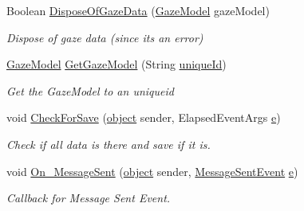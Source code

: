 \begin{DoxyCompactItemize}
Boolean \hyperlink{class_web_analyzer_1_1_controller_1_1_test_controller_a99b6f672f4ef0293ac70edb20e1c7cdb}{Dispose\+Of\+Gaze\+Data} (\hyperlink{class_web_analyzer_1_1_models_1_1_data_model_1_1_gaze_model}{Gaze\+Model} gaze\+Model)
\begin{DoxyCompactList}\small\item\em Dispose of gaze data (since its an error) \end{DoxyCompactList}\item 
\hyperlink{class_web_analyzer_1_1_models_1_1_data_model_1_1_gaze_model}{Gaze\+Model} \hyperlink{class_web_analyzer_1_1_controller_1_1_test_controller_ad375d558e5d63a79680f3fe53f1326b4}{Get\+Gaze\+Model} (String \hyperlink{_u_i_2_h_t_m_l_resources_2js_2lib_2underscore_8min_8js_af690ff5521d79c7128861033ae80ae17}{unique\+Id})
\begin{DoxyCompactList}\small\item\em Get the Gaze\+Model to an uniqueid \end{DoxyCompactList}\item 
void \hyperlink{class_web_analyzer_1_1_controller_1_1_test_controller_a19c13e671b0a950a1b012424fd7c2560}{Check\+For\+Save} (\hyperlink{_u_i_2_h_t_m_l_resources_2js_2lib_2underscore_8min_8js_aae18b7515bb2bc4137586506e7c0c903}{object} sender, Elapsed\+Event\+Args \hyperlink{_u_i_2_h_t_m_l_resources_2js_2lib_2bootstrap_8min_8js_ab5902775854a8b8440bcd25e0fe1c120}{e})
\begin{DoxyCompactList}\small\item\em Check if all data is there and save if it is. \end{DoxyCompactList}\item 
void \hyperlink{class_web_analyzer_1_1_controller_1_1_test_controller_ab70718909a47aded762d0021e5ccb7b2}{On\+\_\+\+Message\+Sent} (\hyperlink{_u_i_2_h_t_m_l_resources_2js_2lib_2underscore_8min_8js_aae18b7515bb2bc4137586506e7c0c903}{object} sender, \hyperlink{class_web_analyzer_1_1_events_1_1_message_sent_event}{Message\+Sent\+Event} \hyperlink{_u_i_2_h_t_m_l_resources_2js_2lib_2bootstrap_8min_8js_ab5902775854a8b8440bcd25e0fe1c120}{e})
\begin{DoxyCompactList}\small\item\em Callback for Message Sent Event. \end{DoxyCompactList}\end{DoxyCompactItemize}
